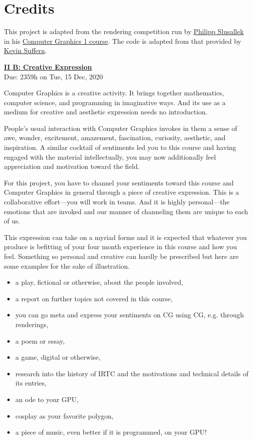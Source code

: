 \documentclass[addpoints]{exam}
\begin{document}
\section*{Credits}

This project is adapted from the rendering competition run by \href{https://graphics.cg.uni-saarland.de/people/slusallek.html}{Philipp Slusallek} in his \href{https://graphics.cg.uni-saarland.de/courses/cg1-2020/}{Computer Graphics 1 course}. The code is adapted from that provided by \href{http://www.raytracegroundup.com/}{Kevin Suffern}.

\newpage


\begin{flushleft}
  \Large{\underline{\bf II B: Creative Expression}}\\\smallskip
  \large{Due: 2359h on Tue, 15 Dec, 2020}
\end{flushleft}

Computer Graphics is a creative activity. It brings together mathematics, computer science, and programming in imaginative ways. And its use as a medium for creative and aesthetic expression needs no introduction.

People's usual interaction with Computer Graphics invokes in them a sense of awe, wonder, excitement, amazement, fascination, curiosity, aesthetic, and inspiration. A similar cocktail of sentiments led you to this course and having engaged with the material intellectually, you may now additionally feel appreciation and motivation toward the field.

For this project, you have to channel your sentiments toward this course and Computer Graphics in general through a piece of creative expression. This is a collaborative effort---you will work in teams. And it is highly personal---the emotions that are invoked and our manner of channeling them are unique to each of us.

This expression can take on a myriad forms and it is expected that whatever you produce is befitting of your four month experience in this course and how you feel. Something so personal and creative can hardly be prescribed but here are some examples for the sake of illustration.
\begin{itemize}
\item a play, fictional or otherwise, about the people involved,
\item a report on further topics not covered in this course,
\item you can go meta and express your sentiments on CG using CG, e.g. through renderings,
\item a poem or essay,
\item a game, digital or otherwise,
\item research into the history of IRTC and the motivations and technical details of its entries,
\item an ode to your GPU,
\item cosplay as your favorite polygon,
\item a piece of music, even better if it is programmed, on your GPU!
\end{itemize}
\end{document}
